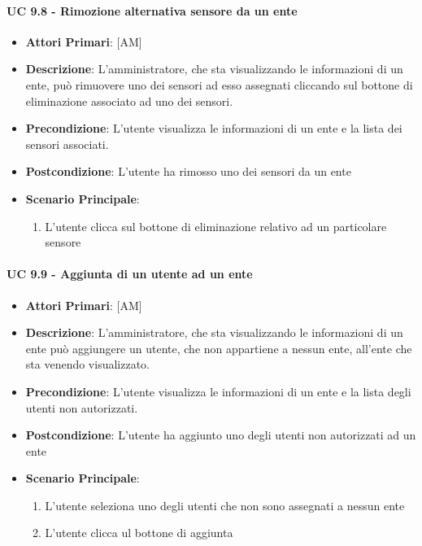 			\paragraph{UC 9.8 - Rimozione alternativa sensore da un ente}
			\begin{itemize}
				\item \textbf{Attori Primari}: [AM]
				\item \textbf{Descrizione}: L'amministratore, che sta visualizzando le informazioni di un ente, può rimuovere uno dei sensori ad esso assegnati cliccando sul bottone di eliminazione associato ad uno dei sensori. 
				\item \textbf{Precondizione}: L'utente visualizza le informazioni di un ente e la lista dei sensori associati.
				\item \textbf{Postcondizione}: L'utente ha rimosso uno dei sensori da un ente 
				\item \textbf{Scenario Principale}:
				\begin{enumerate}
					\item{L'utente clicca sul bottone di eliminazione relativo ad un particolare sensore}
				\end{enumerate}
			\end{itemize}	

			\paragraph{UC 9.9 - Aggiunta di un utente ad un ente}
			\begin{itemize}
				\item \textbf{Attori Primari}: [AM]
				\item \textbf{Descrizione}: L'amministratore, che sta visualizzando le informazioni di un ente può aggiungere un utente, che non appartiene a nessun ente, all'ente che sta venendo visualizzato. 
				\item \textbf{Precondizione}: L'utente visualizza le informazioni di un ente e la lista degli utenti non autorizzati.
				\item \textbf{Postcondizione}: L'utente ha aggiunto uno degli utenti non autorizzati ad un ente 
				\item \textbf{Scenario Principale}:
				\begin{enumerate}
					\item{L'utente seleziona uno degli utenti che non sono assegnati a nessun ente}
					\item{L'utente clicca ul bottone di aggiunta}
				\end{enumerate}	
			\end{itemize}	

